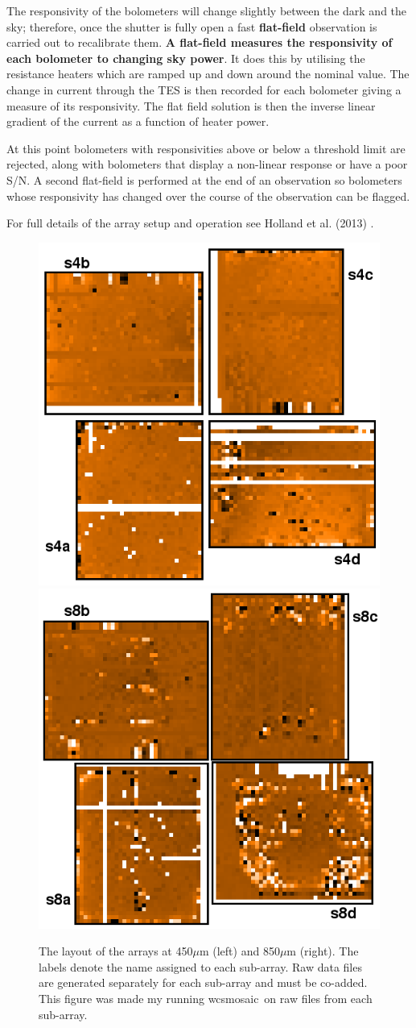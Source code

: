 \documentclass[twoside,11pt]{article}
\newcommand{\xref}[3]{#1}
\renewcommand{\_}{\texttt{\symbol{95}}}
\newcommand{\task}[1]{\textsf{#1}}
\newcommand{\wcsmosaic}{\xref{\task{wcsmosaic}}{sun95}{WCSMOSAIC}}
\begin{document}
The responsivity of the bolometers will change slightly between the
dark and the sky; therefore, once the shutter is fully open a fast
\textbf{flat-field} observation is carried out to recalibrate them.
\textbf{A flat-field measures the responsivity of each bolometer to
changing sky power}. It does this by utilising the resistance heaters
which are ramped up and down around the nominal value. The change in
current through the TES is then recorded for each bolometer giving a
measure of its responsivity. The flat field solution is then the
inverse linear gradient of the current as a function of heater power.

At this point bolometers with responsivities above or below a
threshold limit are rejected, along with bolometers that display a
non-linear response or have a poor S/N. A second flat-field is
performed at the end of an observation so bolometers whose
responsivity has changed over the course of the observation can be
flagged.

For full details of the array setup and operation see Holland et al.
(2013) \cite{s2main}.

\begin{figure}[t!]
\begin{center}
\includegraphics[width=0.4\linewidth]{sc21_450array}
\hspace{1cm}
\includegraphics[width=0.4\linewidth]{sc21_850array}
\label{fig:arrays}
\caption[The physical layout of the arrays at each wavelength]{
  \small The layout of the arrays at 450$\mu$m (left) and
  850$\mu$m (right). The labels denote the name assigned to each
  sub-array. Raw data files are generated separately for each sub-array
  and must be co-added. This figure was made my running \wcsmosaic\ on
  raw files from each sub-array.
}
\end{center}
\end{figure}
\end{document}
